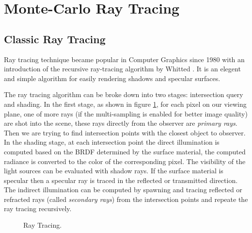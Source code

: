 
\section{Monte-Carlo Ray Tracing} 
\label{sec:mc_rt}

\subsection{Classic Ray Tracing}

Ray tracing technique became popular in Computer Graphics since 1980 with an introduction of the recursive ray-tracing algorithm by Whitted \cite{Whitted1980}. It is an elegent and simple algorithm for easily rendering shadows and specular surfaces. 

The ray tracing algorithm can be broke down into two stages: intersection query and shading. In the first stage, as shown in figure \ref{fig:ray_tracing}, for each pixel on our viewing plane, one of more rays (if the multi-sampling is enabled for better image quality) are shot into the scene, these rays directly from the observer are \emph{primary rays}. Then we are trying to find intersection points with the closest object to observer. In the shading stage, at each intersection point the direct illumination is computed based on the BRDF determined by the surface material, the computed radiance is converted to the color of the corresponding pixel. The visibility of the light sources can be evaluated with shadow rays. If the surface material is specular then a specular ray is traced in the reflected or transmitted direction. The indirect illumination can be computed by spawning and tracing reflected or refracted rays (called \emph{secondary rays}) from the intersection points and repeate the ray tracing recursively. 

\begin{figure}[htp] 
    \centering 
    \renewcommand{\thefigure}{\thechapter.\arabic{figure}}
    \caption[]{Ray Tracing.}
    \label{fig:ray_tracing} 
\end{figure} 

